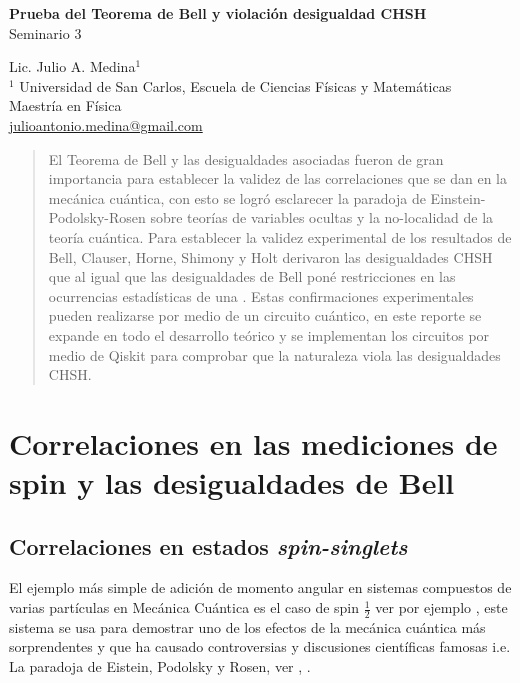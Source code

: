 \documentclass[a4paper]{article}
\begin{document}

\Large
 \begin{center}
\textbf{Prueba del Teorema de Bell y violación desigualdad CHSH}\\
Seminario 3  

\hspace{10pt}

\large
Lic. Julio A. Medina$^1$ \\

\hspace{10pt}
\small  
$^1$ Universidad de San Carlos, Escuela de Ciencias Físicas y Matemáticas\\
Maestría en Física\\
\href{mailto:julioantonio.medina@gmail.com}{julioantonio.medina@gmail.com}\\

\end{center}

\hspace{10pt}


\normalsize

\begin{abstract}
El Teorema de Bell y las desigualdades asociadas fueron de gran importancia para establecer la validez de las correlaciones que se dan en la mecánica cuántica, con esto se logró esclarecer la paradoja de Einstein-Podolsky-Rosen sobre teorías de variables ocultas y la no-localidad de la teoría cuántica. Para establecer la validez experimental de los resultados de Bell, Clauser, Horne, Shimony y Holt derivaron las desigualdades CHSH que al igual que las desigualdades de Bell poné restricciones en las ocurrencias estadísticas de una . Estas confirmaciones experimentales pueden realizarse por medio de un circuito cuántico, en este reporte se expande en todo el desarrollo teórico y se implementan los circuitos por medio de Qiskit para comprobar que la naturaleza viola las desigualdades CHSH.
\end{abstract}

\section{Correlaciones en las mediciones de spin y las desigualdades de Bell}
\subsection{Correlaciones en estados \textit{spin-singlets}}
El ejemplo más simple de adición de momento angular en sistemas compuestos de varias partículas en Mecánica Cuántica es el caso de spin $\frac{1}{2}$ ver por ejemplo \cite{Sakurai}, este sistema se usa para demostrar uno de los efectos de la mecánica cuántica más sorprendentes y que ha causado controversias y discusiones científicas famosas i.e. La paradoja de Eistein, Podolsky y Rosen, ver \cite{Einstein}, \cite{Bell}.\\
\end{document}
